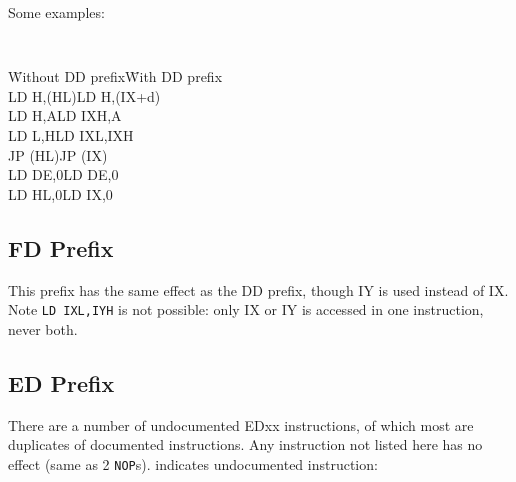 \pagebreak
Some examples:

{\tt 
    \begin{tabbing}
        {\qquad}\={\rm Without DD prefix}\qquad\={\rm With DD prefix}\+ \\
        LD H,(HL)\>LD H,(IX+d)\\
        LD H,A\>LD IXH,A\\
        LD L,H\>LD IXL,IXH\\
        JP (HL)\>JP (IX)\\
        LD DE,0\>LD DE,0\\
        LD HL,0\>LD IX,0\\
    \end{tabbing}
}


\subsection{FD Prefix \cite{gerton}}

This prefix has the same effect as the DD prefix, though IY is used instead of IX.  Note {\tt LD IXL,IYH} is not possible: only IX or IY is accessed in one instruction, never both.


\subsection{ED Prefix \cite{gerton}}

There are a number of undocumented EDxx instructions, of which most are duplicates of documented instructions. Any instruction not listed here has no effect (same as 2 {\tt NOP}s). \See{**} indicates undocumented instruction:

